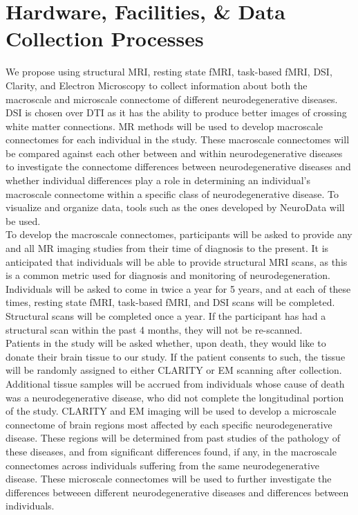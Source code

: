 \documentclass[12pt]{article}
\begin{document}
\section{Hardware, Facilities, \& Data Collection Processes}

	 We propose using structural MRI, resting state fMRI, task-based fMRI, DSI, Clarity, and Electron Microscopy to collect information about both the macroscale and microscale connectome of different neurodegenerative diseases. DSI is chosen over DTI as it has the ability to produce better images of crossing white matter connections. MR methods will be used to develop macroscale connectomes for each individual in the study. These macroscale connectomes will be compared against each other between and within neurodegenerative diseases to investigate the connectome differences between neurodegenerative diseases and whether individual differences play a role in determining an individual’s macroscale connectome within a specific class of neurodegenerative disease. To visualize and organize data, tools such as the ones developed by NeuroData will be used.
    \\
	\indent To develop the macroscale connectomes, participants will be asked to provide any and all MR imaging studies from their time of diagnosis to the present. It is anticipated that individuals will be able to provide structural MRI scans, as this is a common metric used for diagnosis and monitoring of neurodegeneration. Individuals will be asked to come in twice a year for 5 years, and at each of these times, resting state fMRI, task-based fMRI, and DSI scans will be completed. Structural scans will be completed once a year. If the participant has had a structural scan within the past 4 months, they will not be re-scanned. 
    \\
	\indent Patients in the study will be asked whether, upon death, they would like to donate their brain tissue to our study. If the patient consents to such, the tissue will be randomly assigned to either CLARITY or EM scanning after collection. Additional tissue samples will be accrued from individuals whose cause of death was a neurodegenerative disease, who did not complete the longitudinal portion of the study. CLARITY and EM imaging will be used to develop a microscale connectome of brain regions most affected by each specific neurodegenerative disease. These regions will be determined from past studies of the pathology of these diseases, and from significant differences found, if any, in the macroscale connectomes across individuals suffering from the same neurodegenerative disease. These microscale connectomes will be used to further investigate the differences betweeen different neurodegenerative diseases and differences between individuals.
\end{document}

